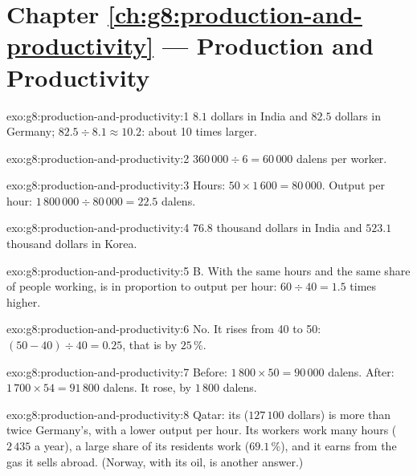 \section*{Chapter \ref{ch:g8:production-and-productivity} --- Production and Productivity}

\begin{solution}{exo:g8:production-and-productivity:1}
$8.1$ dollars in India and $82.5$ dollars in Germany; $82.5 \div 8.1 \approx 10.2$: about 10
times larger.
\end{solution}

\begin{solution}{exo:g8:production-and-productivity:2}
$360\,000 \div 6 = 60\,000$ dalens per worker.
\end{solution}

\begin{solution}{exo:g8:production-and-productivity:3}
Hours: $50 \times 1\,600 = 80\,000$. Output per hour: $1\,800\,000 \div 80\,000 = 22.5$ dalens.
\end{solution}

\begin{solution}{exo:g8:production-and-productivity:4}
$76.8$ thousand dollars in India and $523.1$ thousand dollars in Korea.
\end{solution}

\begin{solution}{exo:g8:production-and-productivity:5}
B. With the same hours and the same share of people working,  is in proportion
to output per hour: $60 \div 40 = 1.5$ times higher.
\end{solution}

\begin{solution}{exo:g8:production-and-productivity:6}
No. It rises from 40 to 50: $(50 - 40) \div 40 = 0.25$, that is by $25\,\%$.
\end{solution}

\begin{solution}{exo:g8:production-and-productivity:7}
Before: $1\,800 \times 50 = 90\,000$ dalens. After: $1\,700 \times 54 = 91\,800$ dalens. It rose,
by $1\,800$ dalens.
\end{solution}

\begin{solution}{exo:g8:production-and-productivity:8}
Qatar: its  ($127\,100$ dollars) is more than twice Germany's, with a lower output
per hour. Its workers work many hours ($2\,435$ a year), a large share of its residents work
($69.1\,\%$), and it earns from the gas it sells abroad. (Norway, with its oil, is another answer.)
\end{solution}

